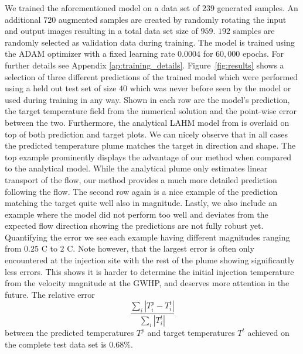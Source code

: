 \documentclass{article} %
\begin{document}

We trained the aforementioned model on a data set of $239$ generated samples. An additional $720$ augmented samples are created by randomly rotating the input and output images resulting in a total data set size of $959$. $192$ samples are randomly selected as validation data during training.
The model is trained using the ADAM optimizer \citep{adam} with a fixed learning rate $0.0004$ for $60,\!000$ epochs.
For further details see Appendix \ref{ap:training_details}.
Figure~\ref{fig:results} shows a selection of three different predictions of the trained model which were performed using a held out test set of size $40$ which was never before seen by the model or used during training in any way.
Shown in each row are the model's prediction, the target temperature field from the numerical solution and the point-wise error between the two.
Furthermore, the analytical LAHM model from \citet{Pophillat2020} is overlaid on top of both prediction and target plots.
We can nicely observe that in all cases the predicted temperature plume matches the target in direction and shape.
The top example prominently displays the advantage of our method when compared to the analytical model.
While the analytical plume only estimates linear transport of the flow, our method provides a much more detailed prediction following the flow.
The second row again is a nice example of the prediction matching the target quite well also in magnitude.
Lastly, we also include an example where the model did not perform too well and deviates from the expected flow direction showing the predictions are not fully robust yet.
Quantifying the error we see each example having different magnitudes ranging from $0.25$ \degree C to $2$ \degree C.
Note however, that the largest error is often only encountered at the injection site with the rest of the plume showing significantly less errors. 
This shows it is harder to determine the initial injection temperature from the velocity magnitude at the GWHP, and deserves more attention in the future. 
The relative error
\begin{equation*}
    \frac{\sum_i \left| T^p_i - T^t_i \right|}{\sum_i \left| T^t_i \right|}
\end{equation*}
between the predicted temperatures $T^p$ and target temperatures $T^t$ achieved on the complete test data set is $0.68 \%$.
\end{document}
